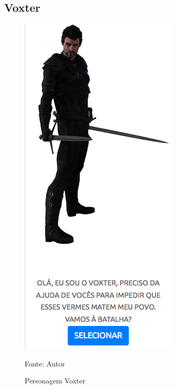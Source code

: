\subsection{Voxter}
\begin{figure}[h]
	\centering
	\includegraphics[keepaspectratio=true,scale=0.5]{figuras/voxter.png}
	\caption{Personagem Voxter}
	Fonte: Autor
	\label{voxter}
\end{figure}

